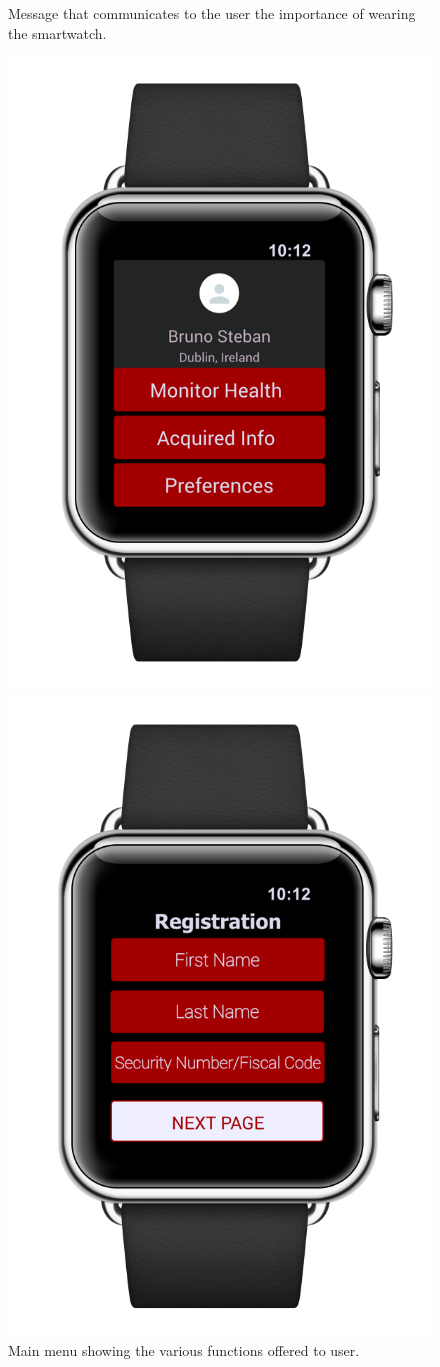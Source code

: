 \begin{enumerate}
\begin{figure}[H]
\begin{center}
\begin{minipage}[c]{.40\textwidth}
	\caption{Message that communicates to the user the importance of wearing the smartwatch.}
        \end{minipage}
      \end{center}
\end{figure}
\begin{figure}[H]
\begin{center}
        \begin{minipage}[c]{.35\textwidth}
	\centering
          \includegraphics[height=9.5 cm]{Images/Mockups/AutomatedSOSMockup5.png}
	\caption{Main menu showing the various functions offered to user.}
        \end{minipage}%
        \hspace{10mm}%
        \begin{minipage}[c]{.40\textwidth}
	\centering
          \includegraphics[height=9.5  cm]{Images/Mockups/AutomatedSOSMockup6.png}

\end{minipage}
\end{center}
\end{figure}
\end{enumerate}
